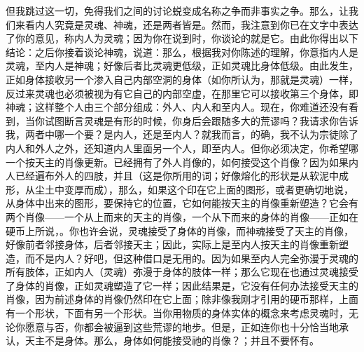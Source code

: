 但我跳过这一切，免得我们之间的讨论蜕变成名称之争而非事实之争。那么，让我们来看内人究竟是灵魂、神魂，还是两者皆是。然而，我注意到你已在文字中表达了你的意见，称内人为灵魂；因为你在说到时，你谈论的就是它。由此你得出以下结论：之后你接着谈论神魂，说道：那么，根据我对你陈述的理解，你意指内人是灵魂，至内人是神魂；好像后者比灵魂更低级，正如灵魂比身体低级。由此发生，正如身体接收另一个渗入自己内部空洞的身体（如你所认为，那就是灵魂）一样，反过来灵魂也必须被视为有它自己的内部空虚，在那里它可以接收第三个身体，即神魂；这样整个人由三个部分组成：外人、内人和至内人。现在，你难道还没有看到，当你试图断言灵魂是有形的时候，你身后会跟随多大的荒谬吗？我请求你告诉我，两者中哪一个要？是内人，还是至内人？就我而言，的确，我不认为宗徒除了内人和外人之外，还知道内人里面另一个人，即至内人。但你必须决定，你希望哪一个按天主的肖像更新。已经拥有了外人肖像的，如何接受这个肖像？因为如果内人已经遍布外人的四肢，并且（这是你所用的词；好像熔化的形状是从软泥中成形，从尘土中变厚而成），那么，如果这个印在它上面的图形，或者更确切地说，从身体中出来的图形，要保持它的位置，它如何能按天主的肖像重新塑造？它会有两个肖像——一个从上而来的天主的肖像，一个从下而来的身体的肖像——正如在硬币上所说，。你也许会说，灵魂接受了身体的肖像，而神魂接受了天主的肖像，好像前者邻接身体，后者邻接天主；因此，实际上是至内人按天主的肖像重新塑造，而不是内人？好吧，但这种借口是无用的。因为如果至内人完全弥漫于灵魂的所有肢体，正如内人（灵魂）弥漫于身体的肢体一样；那么它现在也通过灵魂接受了身体的肖像，正如灵魂塑造了它一样；因此结果是，它没有任何办法接受天主的肖像，因为前述身体的肖像仍然印在它上面；除非像我刚才引用的硬币那样，上面有一个形状，下面有另一个形状。当你用物质的身体实体的概念来考虑灵魂时，无论你愿意与否，你都会被逼到这些荒谬的地步。但是，正如连你也十分恰当地承认，天主不是身体。那么，身体如何能接受祂的肖像？；并且不要怀有。\par


